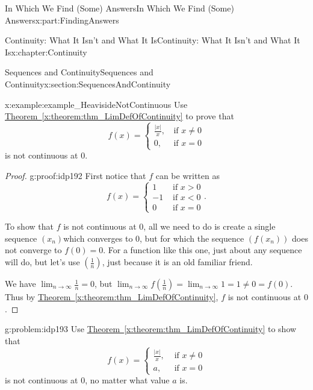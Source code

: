 \documentclass[oneside,10pt,]{book}
\newcommand{\xreffont}{\relax}
\numberwithin{equation}{section}
\newcommand{\abs}[1]{\left|#1\right|}
\newcommand{\lt}{<}
\newcommand{\amp}{&}
\begin{document}
\begin{partptx}{In Which We Find (Some) Answers}{}{In Which We Find (Some) Answers}{}{}{x:part:FindingAnswers}
\begin{chapterptx}{Continuity: What It Isn't and What It Is}{}{Continuity: What It Isn't and What It Is}{}{}{x:chapter:Continuity}
\begin{sectionptx}{Sequences and Continuity}{}{Sequences and Continuity}{}{}{x:section:SequencesAndContinuity}
\begin{example}{}{x:example:example_HeavisideNotContinuous}
Use \hyperref[x:theorem:thm_LimDefOfContinuity]{Theorem~{\xreffont\ref{x:theorem:thm_LimDefOfContinuity}}} to prove that%
\begin{equation*}
f(x)= \begin{cases}\frac{|x|}{x}\text{,} \amp \text{ if } x\neq 0\\ 0\text{,} \amp \text{ if } x=0 \end{cases}
\end{equation*}
is not continuous at \(0\).%
\end{example}
\begin{proof}{}{g:proof:idp192}
First notice that \(f\) can be written as%
\begin{equation*}
f(x)= \begin{cases}1\amp \text{ if } x>0\\ -1\amp \text{ if } x\lt 0\\ 0\amp \text{ if } x=0 \end{cases} \text{.}
\end{equation*}
%
\par
To show that \(f\) is not continuous at \(0\), all we need to do is create a single sequence \(\left(x_n\right)\)which converges to \(0\), but for which the sequence \(\left(f\left(x_n\right)\right)\) does not converge to \(f(0)=0\).  For a function like this one, just about any sequence will do, but let's use \(\left(\frac{1}{n}\right)\), just because it is an old familiar friend.%
\par
We have \(\displaystyle\lim_{n\rightarrow\infty}\frac{1}{n}=0\), but \(\displaystyle\lim_{n\rightarrow\infty}f\left(\frac{1}{n}\right)=\lim_{n\rightarrow
\infty}1=1\neq 0=f(0)\).  Thus by \hyperref[x:theorem:thm_LimDefOfContinuity]{Theorem~{\xreffont\ref{x:theorem:thm_LimDefOfContinuity}}}, \(f\) is not continuous at \(0\).%
\end{proof}
\begin{problem}{}{g:problem:idp193}%
 Use \hyperref[x:theorem:thm_LimDefOfContinuity]{Theorem~{\xreffont\ref{x:theorem:thm_LimDefOfContinuity}}} to show that%
\begin{equation*}
f(x)= \begin{cases}
\frac{\abs{x}}{x},\amp \text{ if } x\neq 0\\
a, \amp \text{ if } x=0 \end{cases}  
\end{equation*}
is not continuous at \(0\), no matter what value \(a\) is.%
\end{problem}

\end{sectionptx}
\end{chapterptx}
\end{partptx}
\end{document}
